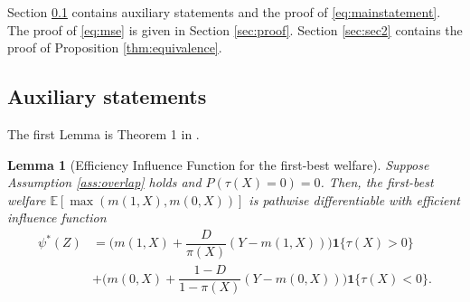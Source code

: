 \documentclass[12pt]{article}
\numberwithin{equation}{section}
\theoremstyle{plain}                         %
\newtheorem{lemma}{Lemma}
\theoremstyle{definition}                  %
\theoremstyle{remark}                      %
\newcommand{\E}{\mathbb{E}}
\begin{document}
Section \ref{sec:LvdL} contains auxiliary statements and the proof of  \eqref{eq:mainstatement}.   The proof of \eqref{eq:mse} is given in  Section \ref{sec:proof}. Section \ref{sec:sec2} contains the proof of Proposition \ref{thm:equivalence}.
 

\subsection{Auxiliary statements}
\label{sec:LvdL}

The first Lemma is Theorem 1 in \citet{LuedtkeLaan}. 
\begin{lemma}[Efficiency Influence Function for the first-best welfare]
\label{lem:LvdL}
Suppose Assumption \ref{ass:overlap} holds and $P(\tau(X)=0)=0$. Then, the first-best welfare  $\E[\max (m(1,X), m(0,X))]$ is pathwise differentiable with efficient influence function 
\begin{align}
\label{eq:efficient}
\psi^{*}(Z) &= \bigg(m(1,X) + \dfrac{D}{\pi(X)} (Y - m(1,X)) \bigg)  \bm{1}\{ \tau(X)>0 \} \\
&+ \bigg(m(0,X) +  \dfrac{1-D}{1-\pi(X)} (Y - m(0,X)) \bigg) \bm{1}\{ \tau(X)<0 \}. \nonumber
\end{align}
\end{lemma}
\end{document}
